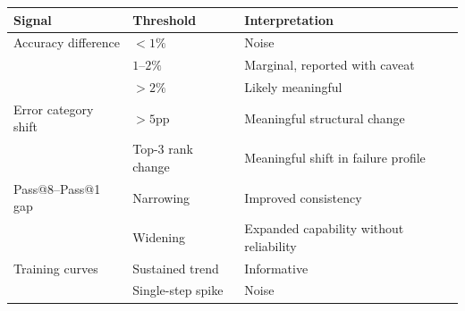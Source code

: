\vspace{1em}
\noindent\begin{minipage}{\linewidth}
\centering
\small
\begin{tabular*}{\linewidth}{@{\extracolsep{\fill}}lll}
\toprule
\textbf{Signal} & \textbf{Threshold} & \textbf{Interpretation} \\
\midrule
Accuracy difference & $< 1\%$ & Noise \\
                    & $1$--$2\%$ & Marginal, reported with caveat \\
                    & $> 2\%$ & Likely meaningful \\
\midrule
Error category shift & $> 5$pp & Meaningful structural change \\
                     & Top-3 rank change & Meaningful shift in failure profile \\
\midrule
Pass@8--Pass@1 gap & Narrowing & Improved consistency \\
                   & Widening & Expanded capability without reliability \\
\midrule
Training curves & Sustained trend & Informative \\
                & Single-step spike & Noise \\
\bottomrule
\end{tabular*}
\addtocounter{table}{1}
\end{minipage}
\vspace{1em}
